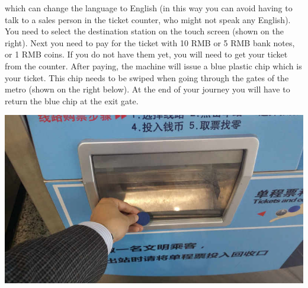 \documentclass[11pt]{report}
\begin{document}
\noindent which can change the language to English (in this
way you can avoid having to talk to a sales person in the ticket 
counter, who might not speak any English). You need to select 
the destination station on the touch screen (shown on
the right). Next you need to pay for the ticket with 10 RMB or 5
RMB bank notes, or 1 RMB coins. If you do not have them yet,
you will need to get your ticket from the counter.
After paying, the machine will issue a blue plastic chip which
is your ticket. This chip needs to be swiped when going
through the gates of the metro (shown on the right below). 
At the end of your journey you will have to return the blue 
chip at the exit gate.

\begin{center}
\includegraphics[scale=0.27]{travel_guide/20150331_110738.jpg}
\hspace{4mm}

\end{center}
\end{document}
